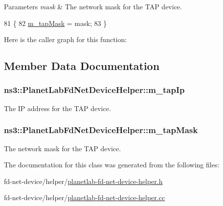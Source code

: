 \begin{DoxyParams}{Parameters}
{\em mask} & The network mask for the T\+AP device. \\
\hline
\end{DoxyParams}

\begin{DoxyCode}
81 \{
82   \hyperlink{classns3_1_1PlanetLabFdNetDeviceHelper_a809572f0a890702c0e9843c44bf76fa0}{m\_tapMask} = mask;
83 \}
\end{DoxyCode}


Here is the caller graph for this function\+:




\subsection{Member Data Documentation}
\subsubsection[{\texorpdfstring{m\+\_\+tap\+Ip}{m_tapIp}}]{ ns3\+::\+Planet\+Lab\+Fd\+Net\+Device\+Helper\+::m\+\_\+tap\+Ip\hspace{0.3cm}{\ttfamily [protected]}}\hypertarget{classns3_1_1PlanetLabFdNetDeviceHelper_a85f9999ccfe2efd2cf5431f09d8b6fb5}{}\label{classns3_1_1PlanetLabFdNetDeviceHelper_a85f9999ccfe2efd2cf5431f09d8b6fb5}
The IP address for the T\+AP device. 
\subsubsection[{\texorpdfstring{m\+\_\+tap\+Mask}{m_tapMask}}]{ ns3\+::\+Planet\+Lab\+Fd\+Net\+Device\+Helper\+::m\+\_\+tap\+Mask\hspace{0.3cm}{\ttfamily [protected]}}\hypertarget{classns3_1_1PlanetLabFdNetDeviceHelper_a809572f0a890702c0e9843c44bf76fa0}{}\label{classns3_1_1PlanetLabFdNetDeviceHelper_a809572f0a890702c0e9843c44bf76fa0}
The network mask for the T\+AP device. 

The documentation for this class was generated from the following files\+:\begin{DoxyCompactItemize}
\item 
fd-\/net-\/device/helper/\hyperlink{planetlab-fd-net-device-helper_8h}{planetlab-\/fd-\/net-\/device-\/helper.\+h}\item 
fd-\/net-\/device/helper/\hyperlink{planetlab-fd-net-device-helper_8cc}{planetlab-\/fd-\/net-\/device-\/helper.\+cc}\end{DoxyCompactItemize}
